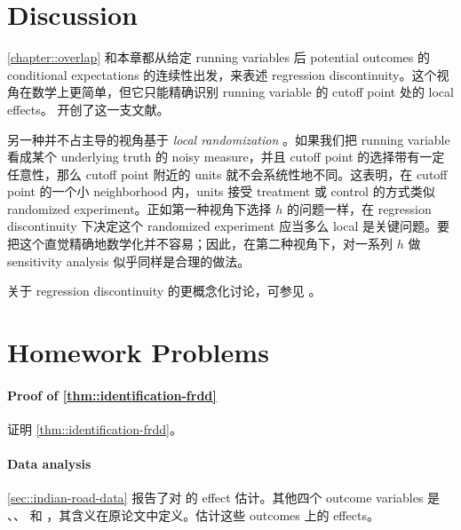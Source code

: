  
 
 \section{Discussion}


\cref{chapter::overlap} 和本章都从给定 running variables 后 potential outcomes 的 conditional expectations 的连续性出发，来表述 regression discontinuity。这个视角在数学上更简单，但它只能精确识别 running variable 的 cutoff point 处的 local effects。\citet{hahn2001identification} 开创了这一支文献。

另一种并不占主导的视角基于 {\it local randomization} \citep{cattaneo2015randomization, li2015evaluating}。如果我们把 running variable 看成某个 underlying truth 的 noisy measure，并且 cutoff point 的选择带有一定任意性，那么 cutoff point 附近的 units 就不会系统性地不同。这表明，在 cutoff point 的一个小 neighborhood 内，units 接受 treatment 或 control 的方式类似 randomized experiment。正如第一种视角下选择 $h$ 的问题一样，在 regression discontinuity 下决定这个 randomized experiment 应当多么 local 是关键问题。要把这个直觉精确地数学化并不容易；因此，在第二种视角下，对一系列 $h$ 做 sensitivity analysis 似乎同样是合理的做法。


关于 regression discontinuity 的更概念化讨论，可参见 \citet{sekhon2017interpreting}。



 
\section{Homework Problems}

\paragraph{Proof of \cref{thm::identification-frdd}}\label{para::proof-theorem-frd}

证明 \cref{thm::identification-frdd}。


\paragraph{Data analysis}
 
\cref{sec::indian-road-data} 报告了对  的 effect 估计。其他四个 outcome variables 是 、、 和 ，其含义在原论文中定义。估计这些 outcomes 上的 effects。

